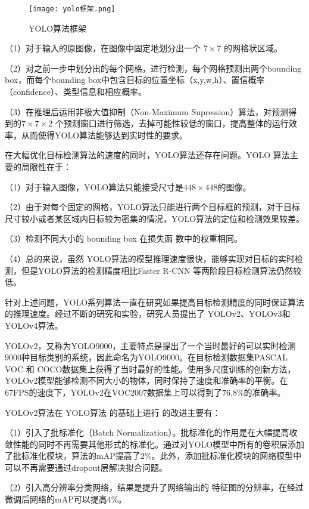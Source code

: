\begin{figure}[htbp]
    \centering
    \texttt{[image: yolo框架.png]}
    \caption{YOLO算法框架}
    \label{yk}
\end{figure}

（1）对于输入的原图像，在图像中固定地划分出一个 $7 \times 7$ 的网格状区域。

（2）对之前一步中划分出的每个网格，进行检测，每个网格预测出两个bounding box，而每个bounding box中包含目标的位置坐标（x,y,w,h）、置信概率（confidence）、类型信息和相应概率。

（3）在推理后运用非极大值抑制（Non-Maximum Supression）算法，对预测得到的$7 \times 7 \times 2$ 个预测窗口进行筛选，去掉可能性较低的窗口，提高整体的运行效率，从而使得YOLO算法能够达到实时性的要求。

在大幅优化目标检测算法的速度的同时，YOLO算法还存在问题。YOLO 算法主要的局限性在于：

（1）对于输入图像，YOLO算法只能接受尺寸是$448 \times 448$的图像。

（2）由于对每个固定的网格，YOLO算法只能进行两个目标框的预测，对于目标尺寸较小或者某区域内目标较为密集的情况，YOLO算法的定位和检测效果较差。

（3）检测不同大小的 bounding box 在损失函
数中的权重相同。

（4）总的来说，虽然 YOLO算法的模型推理速度很快，能够实现对目标的实时检测，但是YOLO算法的检测精度相比Faster R-CNN 等两阶段目标检测算法仍然较低。

针对上述问题，YOLO系列算法一直在研究如果提高目标检测精度的同时保证算法的推理速度。经过不断的研究和实验，研究人员提出了 YOLOv2\cite{redmon2017yolo9000}、YOLOv3\cite{redmon2018yolov3}和YOLOv4\cite{AlexeyBochkovskiy2020YOLOv4OS}算法。

YOLOv2，又称为YOLO9000，主要特点是提出了一个当时最好的可以实时检测9000种目标类别的系统，因此命名为YOLO9000。在目标检测数据集PASCAL VOC 和 COCO数据集上获得了当时最好的性能。使用多尺度训练的创新方法，YOLOv2模型能够检测不同大小的物体，同时保持了速度和准确率的平衡。在67FPS的速度下，YOLOv2在VOC2007数据集上可以得到了$76.8\%$的准确率。

YOLOv2算法在 YOLO算法 的基础上进行
的改进主要有：

（1）引入了批标准化（Batch Normalization）。批标准化的作用是在大幅提高收敛性能的同时不再需要其他形式的标准化。通过对YOLO模型中所有的卷积层添加了批标准化模块，算法的mAP提高了$2\%$。此外，添加批标准化模块的网络模型中可以不再需要通过dropout层解决拟合问题。

（2）引入高分辨率分类网络，结果是提升了网络输出的 特征图的分辨率，在经过微调后网络的mAP可以提高$4\%$。

